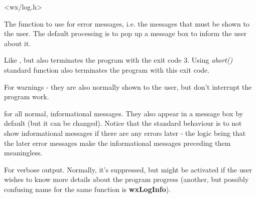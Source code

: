 
<wx/log.h>

\label{wxlogerror}


The function to use for error messages, i.e. the messages that must be shown
to the user. The default processing is to pop up a message box to inform the
user about it.

\label{wxlogfatalerror}


Like , but also
terminates the program with the exit code 3. Using {\it abort()} standard
function also terminates the program with this exit code.

\label{wxlogwarning}


For warnings - they are also normally shown to the user, but don't interrupt
the program work.

\label{wxlogmessage}


for all normal, informational messages. They also appear in a message box by
default (but it can be changed). Notice that the standard behaviour is to not
show informational messages if there are any errors later - the logic being
that the later error messages make the informational messages preceding them
meaningless.

\label{wxlogverbose}


For verbose output. Normally, it's suppressed, but
might be activated if the user wishes to know more details about the program
progress (another, but possibly confusing name for the same function is {\bf wxLogInfo}).

\label{wxlogstatus}



